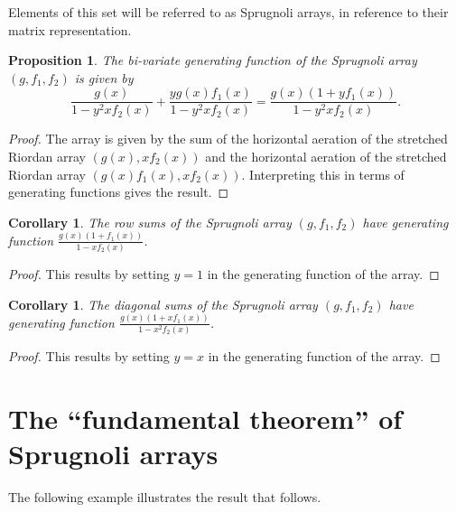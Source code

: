 \documentclass[12pt,reqno]{article}
\newtheorem{proposition}[theorem]{Proposition}
\newtheorem{corollary}[theorem]{Corollary}
\theoremstyle{definition}
\begin{document}
Elements of this set will be referred to as Sprugnoli arrays, in reference to their matrix representation.
\begin{proposition}
The bi-variate generating function of the Sprugnoli array $(g, f_1, f_2)$ is given by
$$\frac{g(x)}{1-y^2xf_2(x)}+\frac{yg(x)f_1(x)}{1-y^2xf_2(x)}=\frac{g(x)(1+yf_1(x))}{1-y^2xf_2(x)}.$$
\end{proposition}
\begin{proof} The array is given by the sum of the horizontal aeration of the stretched Riordan array $(g(x), xf_2(x))$ and the horizontal aeration of the stretched Riordan array $(g(x)f_1(x), xf_2(x))$. Interpreting this in terms of generating functions gives the result.
\end{proof}
\begin{corollary} The row sums of the Sprugnoli array $(g, f_1, f_2)$ have generating function $\frac{g(x)(1+f_1(x))}{1-xf_2(x)}$.
\end{corollary}
\begin{proof} This results by setting $y=1$ in the generating function of the array.
\end{proof}
\begin{corollary} The diagonal sums of the Sprugnoli array $(g, f_1, f_2)$ have generating function $\frac{g(x)(1+xf_1(x))}{1-x^2f_2(x)}$.
\end{corollary}
\begin{proof} This results by setting $y=x$ in the generating function of the array.
\end{proof}

\section{The ``fundamental theorem'' of Sprugnoli arrays}
The following example illustrates the result that follows.
\end{document}
